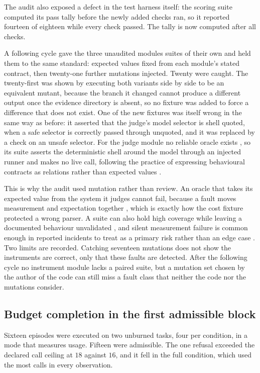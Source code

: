 \documentclass[11pt,a4paper]{article}
\begin{document}
The audit also exposed a defect in the test harness itself: the scoring suite computed
its pass tally before the newly added checks ran, so it reported fourteen of eighteen
while every check passed. The tally is now computed after all checks.

A following cycle gave the three unaudited modules suites of their own and held them
to the same standard: expected values fixed from each module's stated contract, then
twenty-one further mutations injected. Twenty were caught. The twenty-first was shown by
executing both variants side by side to be an equivalent mutant, because the branch it
changed cannot produce a different output once the evidence directory is absent, so no
fixture was added to force a difference that does not exist. One of the new fixtures was
itself wrong in the same way as before: it asserted that the judge's model selector is
shell quoted, when a safe selector is correctly passed through unquoted, and it was
replaced by a check on an unsafe selector. For the judge module no reliable oracle exists
\citep{oracleavailability2026}, so its suite asserts the deterministic shell around the
model through an injected runner and makes no live call, following the practice of
expressing behavioural contracts as relations rather than expected values
\citep{metamorphicrelations2026}.

This is why the audit used mutation rather than review. An oracle that takes its
expected value from the system it judges cannot fail, because a fault moves measurement
and expectation together \citep{oracleanchoring2026}, which is exactly how the cost
fixture protected a wrong parser. A suite can also hold high coverage while leaving a
documented behaviour unvalidated \citep{coveragebehaviour2026}, and silent measurement
failure is common enough in reported incidents to treat as a primary risk rather than an
edge case \citep{evalblindness2026}. Two limits are recorded. Catching seventeen
mutations does not show the instruments are correct, only that these faults are
detected. After the following cycle no
instrument module lacks a paired suite, but a mutation set chosen by the author of the
code can still miss a fault class that neither the code nor the mutations consider.

\subsection{Budget completion in the first admissible block}

Sixteen episodes were executed on two unburned tasks, four per condition, in a mode that
measures usage. Fifteen were admissible. The one refusal exceeded the declared call
ceiling at $18$ against $16$, and it fell in the full condition, which used the most
calls in every observation.
\end{document}
